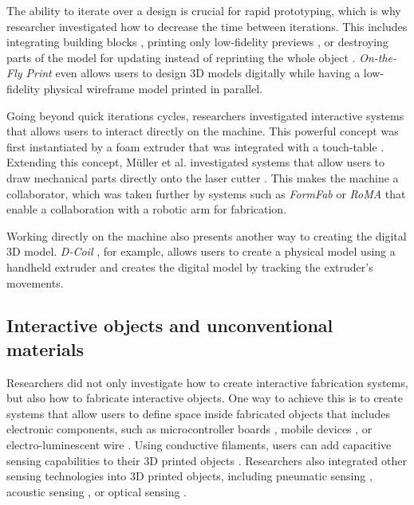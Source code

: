 The ability to iterate over a design is crucial for rapid prototyping, which is why researcher investigated how to decrease the time between iterations. This includes integrating building blocks \cite{Mueller2014}, printing only low-fidelity previews \cite{Mueller2014a}, or destroying parts of the model for updating instead of reprinting the whole object \cite{Teibrich2015}. \textit{On-the-Fly Print} \cite{Peng2016} even allows users to design 3D models digitally while having a low-fidelity physical wireframe model printed in parallel. 


Going beyond quick iterations cycles, researchers investigated interactive systems that allows users to interact directly on the machine. This powerful concept was first instantiated by a foam extruder that was integrated with a touch-table \cite{Willis2011a}. Extending this concept, Müller et al. investigated systems that allow users to draw mechanical parts directly onto the laser cutter \cite{Mueller2012a, Mueller2013}. This makes the machine a collaborator, which was taken further by systems such as \textit{FormFab} \cite{Baudisch2017} or \textit{RoMA} \cite{Peng2018} that enable a collaboration with a robotic arm for fabrication.

Working directly on the machine also presents another way to creating the digital 3D model. \textit{D-Coil} \cite{Peng2015a}, for example, allows users to create a physical model using a handheld extruder and creates the digital model by tracking the extruder's movements. 



\subsection{Interactive objects and unconventional materials}

Researchers did not only investigate how to create interactive fabrication systems, but also how to fabricate interactive objects. One way to achieve this is to create systems that allow users to define space inside fabricated objects that includes electronic components, such as microcontroller boards \cite{Weichel2013}, mobile devices \cite{Ledo2017}, or electro-luminescent wire \cite{Savage2014}. Using conductive filaments, users can add capacitive sensing capabilities to their 3D printed objects \cite{Schmitz2017, Burstyn2015, Vasilevitsky2016, Katsumoto2013}. Researchers also integrated other sensing technologies into 3D printed objects, including pneumatic sensing \cite{Savage2014, Slyper2012, He2017}, acoustic sensing \cite{Savage2015}, or optical sensing \cite{Willis2012, Savage2013}.

